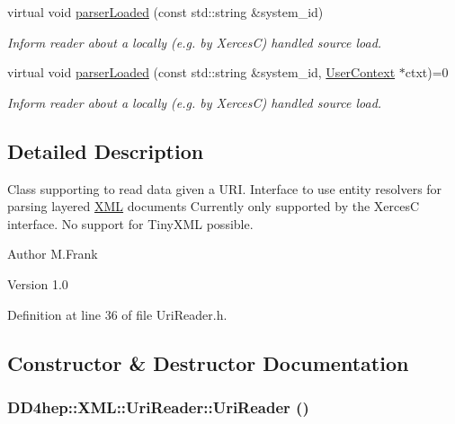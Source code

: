 \begin{DoxyCompactItemize}
virtual void \hyperlink{class_d_d4hep_1_1_x_m_l_1_1_uri_reader_a58d5ece4bc5ee3b5d1d8f9eac85baecd}{parserLoaded} (const std::string \&system\_\-id)
\begin{DoxyCompactList}\small\item\em Inform reader about a locally (e.g. by XercesC) handled source load. \item\end{DoxyCompactList}\item 
virtual void \hyperlink{class_d_d4hep_1_1_x_m_l_1_1_uri_reader_ad04589fb5da7fe238c1a0cf1c8e4f0ac}{parserLoaded} (const std::string \&system\_\-id, \hyperlink{struct_d_d4hep_1_1_x_m_l_1_1_uri_reader_1_1_user_context}{UserContext} $\ast$ctxt)=0
\begin{DoxyCompactList}\small\item\em Inform reader about a locally (e.g. by XercesC) handled source load. \item\end{DoxyCompactList}\end{DoxyCompactItemize}


\subsection{Detailed Description}
Class supporting to read data given a URI. Interface to use entity resolvers for parsing layered \hyperlink{namespace_d_d4hep_1_1_x_m_l}{XML} documents Currently only supported by the XercesC interface. No support for TinyXML possible.

\begin{DoxyAuthor}{Author}
M.Frank 
\end{DoxyAuthor}
\begin{DoxyVersion}{Version}
1.0 
\end{DoxyVersion}


Definition at line 36 of file UriReader.h.

\subsection{Constructor \& Destructor Documentation}
\hypertarget{class_d_d4hep_1_1_x_m_l_1_1_uri_reader_a9e7b119a191640572c3cdf2b8c3e3023}{
\subsubsection[{UriReader}]{\setlength{\rightskip}{0pt plus 5cm}DD4hep::XML::UriReader::UriReader ()}}
\label{class_d_d4hep_1_1_x_m_l_1_1_uri_reader_a9e7b119a191640572c3cdf2b8c3e3023}



